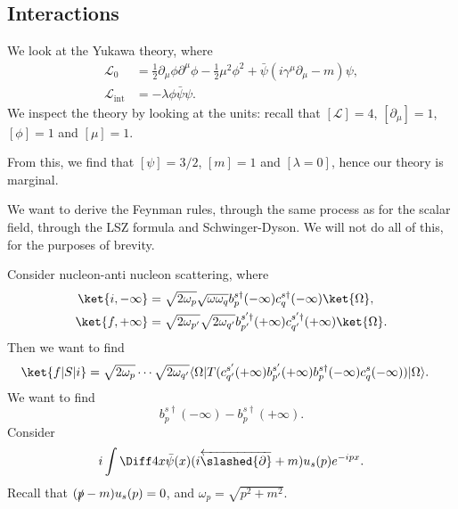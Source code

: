 \documentclass[12pt]{article}
\begin{document}
\subsection{Interactions}%
\label{sub:dirac_int}

We look at the Yukawa theory, where
\begin{align*}
	\mathcal{L}_0 &= \frac 12 \partial_\mu \phi \partial^\mu \phi - \frac 12 \mu^2 \phi^2 + \bar \psi(i \gamma^\mu \partial_\mu - m)\psi, \\
	\mathcal{L}_{\mathrm{int}} &= - \lambda \phi \bar \psi \psi.
\end{align*}
We inspect the theory by looking at the units: recall that $[\mathcal{L}] = 4$, $[\partial_\mu] = 1$, $[\phi] = 1$ and $[\mu] = 1$.

From this, we find that $[\psi] = 3/2$, $[m] = 1$ and $[\lambda = 0]$, hence our theory is marginal.

We want to derive the Feynman rules, through the same process as for the scalar field, through the LSZ formula and Schwinger-Dyson. We will not do all of this, for the purposes of brevity.

Consider nucleon-anti nucleon scattering, where
\begin{align*}
	\ket{i, -\infty} &= \sqrt{2\omega_p} \sqrt{\omega \omega_q} b_p^{s\dagger} (-\infty) c_q^{s\dagger}(-\infty) \ket{\Omega}, \\
	\ket{f, +\infty} &= \sqrt{2\omega_{p'}} \sqrt{2 \omega_{q'}} b_{p'}^{s'\dagger} (+\infty) c_{q'} ^{s'\dagger} (+\infty) \ket{\Omega}.
\end{align*}
Then we want to find
\begin{align*}
	\ket{f|S|i} &= \sqrt{2 \omega_p} \cdots \sqrt{2 \omega_{q'}} \langle \Omega | T(c_{q'}^{s'}(+\infty) b_{p'}^{s'}(+\infty) b_p^{s\dagger}(-\infty) c_q^{s}(-\infty))| \Omega\rangle.
\end{align*}
We want to find
\[
b_p^{s\dagger}(-\infty) - b_p^{s\dagger}(+\infty).
\]
Consider
\[
	i \int \Diff 4 x \bar \psi(x) (i \overleftarrow{\slashed{\partial}} + m) u_s(p) e^{-ipx}.
\]
Recall that $(\slashed{p} - m) u_s (p) = 0$, and $\omega_p = \sqrt{p^2 + m^2}$.

\end{document}
